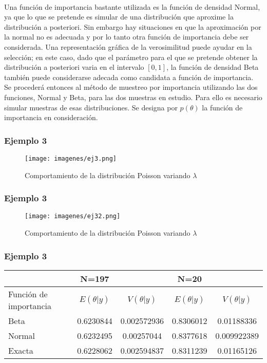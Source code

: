 \documentclass[12pt]{beamer}
\begin{document}
\begin{frame}
~\\Una función de importancia bastante utilizada es la función de densidad Normal, ya que lo que se pretende es simular de una distribución que aproxime la distribución a posteriori. Sin embargo hay situaciones en que la aproximación por la normal no es adecuada y por lo tanto otra función de importancia debe ser considerada. Una representación gráfica de la verosimilitud puede ayudar en la selección; en este caso, dado que el parámetro para el que se pretende obtener la distribución a posteriori varia en el intervalo $[0,1]$, la función de densidad Beta también puede considerarse adecada como candidata a función de importancia.
~\\Se procederá entonces al método de muestreo por importancia utilizando las dos funciones, Normal y Beta, para las dos muestras en estudio. Para ello es necesario simular muestras de esas distribuciones. Se designa por $p(\theta)$ la función de importancia en consideración. 
\end{frame}

\begin{frame}
\frametitle{Ejemplo 3}
\begin{figure}[!h]
    \begin{center}
        \texttt{[image: imagenes/ej3.png]}
        \caption{Comportamiento de la distribución Poisson variando $\lambda$}
        \label{fig:Densidad}
    \end{center}
\end{figure}
\end{frame}

\begin{frame}
\frametitle{Ejemplo 3}
\begin{figure}[!h]
    \begin{center}
        \texttt{[image: imagenes/ej32.png]}
        \caption{Comportamiento de la distribución Poisson variando $\lambda$}
        \label{fig:Densidad}
    \end{center}
\end{figure}
\end{frame}

\begin{frame}
\frametitle{Ejemplo 3}
\center
\begin{tabular}{|p{2.2cm}|cc|cc|}
\hline 
 & N=197 &  & N=20 &  \\ 
\hline 
Función de importancia & $E(\theta|y)$ & $V(\theta|y)$ & $E(\theta|y)$ & $V(\theta|y)$ \\ 
\hline 
Beta &  0.6230844 & 0.002572936 & 0.8306012 & 0.01188336 \\ 
\hline 
Normal & 0.6232495 & 0.00257044 & 0.8377618 & 0.009922389 \\ 
\hline 
Exacta & 0.6228062 & 0.002594837 & 0.8311239 & 0.01165126 \\ 
\hline 
\end{tabular} 
\end{frame}
\end{document}
